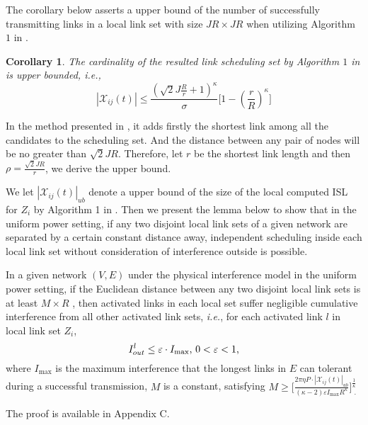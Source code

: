 \documentclass[journal]{IEEEtran}
\begin{document}
The corollary below asserts a upper bound of  the number of successfully transmitting links in a local link set with size $JR \times JR$ when utilizing Algorithm $1$ in \cite{S:phy9}.
\newtheorem{corollary}{Corollary}
\begin{corollary}
The cardinality of the resulted link scheduling set by Algorithm $1$ in  \cite{S:phy9} is upper bounded, \emph{i.e.},
\[
    |\mathcal{X}_{ij}(t)| \le \frac{(\sqrt{2}J \frac{R}{r}+1)^{\kappa}}{\sigma} \biggl[ 1 - (\frac{r}{R})^{\kappa} \biggl]
\]
\end{corollary}
\begin{IEEEproof}
In the method presented in \cite{S:phy4}, it adds firstly the shortest link among all the candidates to the scheduling set. And the distance between any pair of nodes will be no greater than $\sqrt{2}JR$. Therefore, let $r$  be the shortest link length and then  $\rho=\frac{\sqrt{2}JR}{r}$,  we derive the upper bound.
\end{IEEEproof}

We let $ |\mathcal{X}_{ij} (t)|_{ub}$ denote a upper bound of the size of the local computed ISL for $Z_i$ by Algorithm 1 in \cite{S:phy9}. Then we present the lemma below to show that in the uniform power setting, if any two disjoint local link sets of a given network are separated by a certain constant distance away, independent scheduling inside each local link set without consideration of interference outside is possible.
\begin{lemma}
In a given network $(V,E)$ under the physical interference model in the uniform power setting, if the Euclidean distance between any two disjoint local link sets is at least $M\times R $ , then activated links in each local set suffer negligible cumulative interference from all other activated link sets, \emph{i.e.}, for each activated link $l$ in local link set $Z_i $,
\vspace*{-0.25\baselineskip}
\[
 I_{out}^l \le \varepsilon \cdot I_{\max} \mbox{, } 0< \varepsilon <1  \mbox{,}
 \vspace*{-0.25\baselineskip}
\]
where $I_{\max}$ is the maximum interference that the longest links in $E$ can tolerant during a successful transmission,  $M$ is a constant, satisfying
{\small{$
    M \ge \biggl[ \frac{2 \pi \eta P \cdot |\mathcal{X}_{ij} (t)|_{ub}}{(\kappa-2) \varepsilon  I_{\max}R^{\kappa}} \biggr]^{\frac{1}{\kappa}}_{\mbox{~.}}
$}}
\label{lemma5}
\end{lemma}
\begin{IEEEproof}
The proof is available in Appendix C.
\end{IEEEproof}
\end{document}

